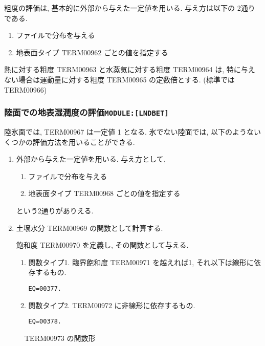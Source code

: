 粗度の評価は, 基本的に外部から与えた一定値を用いる. 
与え方は以下の 2通りである. 
\begin{enumerate}
    \item ファイルで分布を与える
    \item 地表面タイプ TERM00962 ごとの値を指定する
\end{enumerate}

熱に対する粗度 TERM00963 と水蒸気に対する粗度 TERM00964 は, 
特に与えない場合は運動量に対する粗度 TERM00965 の定数倍とする. 
(標準では TERM00966)

\subsubsection{陸面での地表湿潤度の評価\texttt{MODULE:[LNDBET]}}

陸氷面では, TERM00967 は一定値 1 となる.
氷でない陸面では, 以下のようないくつかの評価方法を用いることができる.
\begin{enumerate}
\item 外部から与えた一定値を用いる. 与え方として,
      \begin{enumerate}
      \item ファイルで分布を与える
      \item 地表面タイプ TERM00968 ごとの値を指定する
      \end{enumerate}
      という2通りがありえる.

\item 土壌水分 TERM00969 の関数として計算する.

       飽和度 TERM00970 を定義し,
       その関数として与える.

      \begin{enumerate}
      \item 関数タイプ1.
            臨界飽和度 TERM00971 を越えれば1, それ以下は線形に依存するもの.

        \begin{verbatim}
EQ=00377.
\end{verbatim}

      \item 関数タイプ2. TERM00972 に非線形に依存するもの.

        \begin{verbatim}
EQ=00378.
\end{verbatim}
      \end{enumerate}

\end{enumerate}

  \begin{figure}[htbp]
    \begin{center}
      \leavevmode
      \caption{TERM00973 の関数形}
    \end{center}
  \end{figure}


